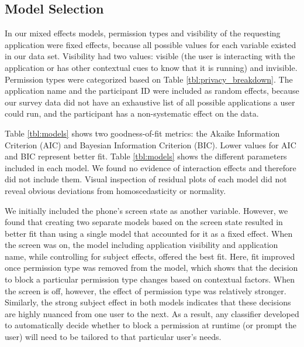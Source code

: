 \documentclass[letterpaper,twocolumn,10pt]{article}
\begin{document}
\subsection{Model Selection}
In our mixed effects models, permission types and visibility of the requesting application were fixed effects, because all possible values for each variable existed in our data set. Visibility had two values: visible (the user is interacting with the application or has other contextual cues to know that it is running) and invisible. Permission types were categorized based on Table \ref{tbl:privacy_breakdown}. The application name and the participant ID were included as random effects, because our survey data did not have an exhaustive list of all possible applications a user could run, and the participant has a non-systematic effect on the data.





Table \ref{tbl:models} shows two goodness-of-fit metrics: the Akaike Information Criterion (AIC) and Bayesian Information Criterion (BIC). Lower values for AIC and BIC represent better fit. Table \ref{tbl:models} shows the different parameters included in each model. We found no evidence of interaction effects and therefore did not include them. Visual inspection of residual plots of each model did not reveal obvious deviations from homoscedasticity or normality.

We initially included the phone's screen state as another variable. However, we found that creating two separate models based on the screen state resulted in better fit than using a single model that accounted for it as a fixed effect. When the screen was on, the model including application visibility and application name, while controlling for subject effects, offered the best fit. Here, fit improved once permission type was removed from the model, which shows that the decision to block a particular permission type changes based on contextual factors. When the screen is off, however, the effect of permission type was relatively stronger. Similarly, the strong subject effect in both models indicates that these decisions are highly nuanced from one user to the next. As a result, any classifier developed to automatically decide whether to block a permission at runtime (or prompt the user) will need to be tailored to that particular user's needs.
\end{document}
